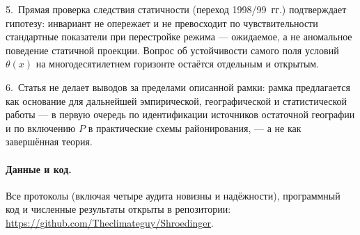 \documentclass[11pt,a4paper]{article}
\begin{document}
5.~Прямая проверка следствия статичности (переход 1998/99~гг.) подтверждает гипотезу: инвариант не опережает и не превосходит по чувствительности стандартные показатели при перестройке режима --- ожидаемое, а не аномальное поведение статичной проекции. Вопрос об устойчивости самого поля условий $\theta(x)$ на многодесятилетнем горизонте остаётся отдельным и открытым.

6.~Статья не делает выводов за пределами описанной рамки: рамка предлагается как основание для дальнейшей эмпирической, географической и статистической работы --- в первую очередь по идентификации источников остаточной географии и по включению $P$ в практические схемы районирования, --- а не как завершённая теория.

\paragraph{Данные и код.} Все протоколы (включая четыре аудита новизны и надёжности), программный код и численные результаты открыты в репозитории: \url{https://github.com/Theclimateguy/Shroedinger}.

\printbibliography[title={Список литературы}]
\end{document}
